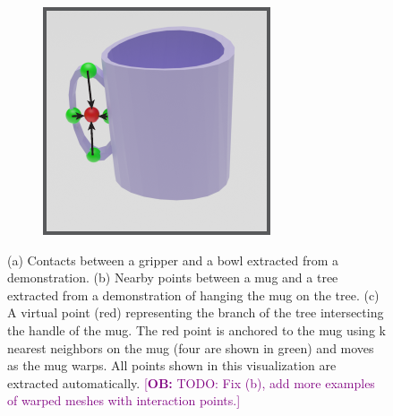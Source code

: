 \documentclass{article}
\newcommand{\ob}[1]{\textcolor{purple}{[\textbf{OB:} #1]}}
\begin{document}
\begin{figure}
\begin{subfigure}[b]{0.25\textwidth}
        \caption{}
    \end{subfigure}
    \hspace{0.05\textwidth}
    \begin{subfigure}[b]{0.25\textwidth}
        \centering
        \includegraphics[width=\textwidth]{figures/contact_fig2.pdf}
        \caption{}
    \end{subfigure}
    \caption{(a) Contacts between a gripper and a bowl extracted from a demonstration. (b) Nearby points between a mug and a tree extracted from a demonstration of hanging the mug on the tree. (c) A virtual point (red) representing the branch of the tree intersecting the handle of the mug. The red point is anchored to the mug using k nearest neighbors on the mug (four are shown in green) and moves as the mug warps. All points shown in this visualization are extracted automatically. \ob{TODO: Fix (b), add more examples of warped meshes with interaction points.}} %
    \label{fig:contacts}
\end{figure}
\end{document}
